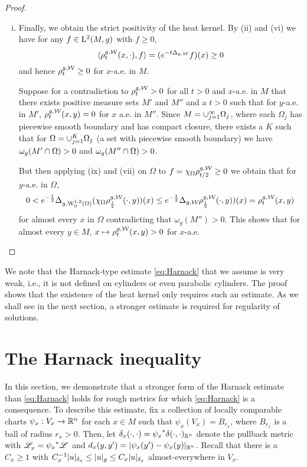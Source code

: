 \documentclass[a4paper, 12pt]{amsart}
\begin{document}
\begin{proof}
\begin{enumerate}[(i)]
\item Finally, we obtain the strict positivity of the heat kernel. By (ii) and (vi) we have for any $f \in \Lp{2}(M, g)$ with $f \geq 0$,
        $$\inprod{\hk^{g,\cW}_t(x,\cdot), f} = (e^{-t \Delta_{g,\cW}}f) (x) \geq 0$$
        and hence $\hk_t^{g,\cW} \geq 0$ for $x$-a.e. in $M$.

        Suppose for a contradiction to $\hk_t^{g,\cW} > 0$ for all $t > 0$ and $x$-a.e. in $M$ that there exists positive measure sets $M'$ and $M''$ and a $t > 0$ such that for $y$-a.e. in $M'$, $\hk^{g,\cW}_t(x,y) = 0$ for $x$ a.e. in $M''$.
	Since $M = \union_{j=1}^\infty \Omega_j$, where each $\Omega_j$ has piecewise smooth boundary and has compact closure, 
	there exists a $K$ such that for $\Omega = \union_{j=1}^K \Omega_j$ (a set with piecewise smooth boundary) we have $\omega_g(M' \intersect \Omega) > 0$ and $\omega_g(M'' \intersect \Omega) > 0$.
        
	But then applying (ix) and (vii) on $\Omega$ to $f = \chi_{\Omega} \hk^{g,\cW}_{t/2} \geq 0$ we obtain that for $y$-a.e. in $\Omega$,
	$$0 < e^{-\frac{t}{2}} \Delta_{g,\SobH[0]{1}(\Omega)}(\chi_{\Omega} \hk^{g,\cW}_{\frac{t}{2}}(\cdot,y))(x) \leq e^{-\frac{t}{2}} \Delta_{g,\cW}\hk^{g,\cW}_{\frac{t}{2}}(\cdot,y))(x)  = \hk^{g,\cW}_{t}(x,y)$$
	for almost every $x$ in $\Omega$ contradicting that $\omega_g(M'') > 0$.
        This shows that for almost every $y \in M$, $x \mapsto \hk^{g,\cW}_t(x,y) > 0$ for $x$-a.e.
	\qedhere
\end{enumerate} 
\end{proof}

\begin{rem}
We note that the Harnack-type estimate \eqref{eq:Harnack} that we assume is very 
weak, i.e., it is not defined on cylinders or even 
parabolic cylinders. The proof shows that the existence 
of the heat kernel only requires such an estimate. 
As we shall see in the next section, a stronger
estimate is required for regularity of solutions. 
\end{rem}

\section{The Harnack inequality}
\label{sec:harnack}

In this section, we demonstrate that a
stronger form of the  Harnack 
estimate than \eqref{eq:Harnack} holds for rough 
metrics for which  \eqref{eq:Harnack} is a consequence.
To describe this estimate, fix a collection of 
locally comparable charts $\psi_x:V_x \to \R^n$ 
for each $x \in M$ such that $\psi_x(V_x) = B_{r_x}$,
where $B_{r_x}$ is a ball of radius $r_x > 0$. 
Then, let
$\delta_x(\cdot, \cdot) = \pullb{\psi_x}\delta(\cdot, \cdot)_{\R^n}$
denote the pullback metric with $\Leb_x = \pullb{\psi_x}\Leb$
and $d_x(y,y') = \modulus{\psi_x(y') - \psi_x(y)}_{\R^n}$.
Recall that there is a $C_x \geq 1$
with $C_x^{-1}  \modulus{u}_{\delta_x} \leq \modulus{u}_g \leq C_x \modulus{u}_{\delta_x}$
almost-everywhere in $V_x$.
\end{document}

